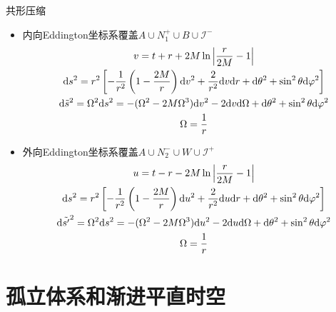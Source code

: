 共形压缩
\begin{itemize}
    \item 内向Eddington坐标系覆盖$A \cup N_1^+ \cup B \cup \mathscr{I}^-$
    \begin{gather*}
        v = t + r + 2M \ln \left|\frac{r}{2M} - 1\right|
        \\
        \mathrm{d} s^2 = r^2 \left[-\frac{1}{r^2}\left(1 - \frac{2M}{r}\right) \mathrm{d} v^2 + \frac{2}{r^2} \mathrm{d} v \mathrm{d} r + \mathrm{d} \theta^2 + \sin^2 \theta \mathrm{d} \varphi^2\right]
        \\
        \mathrm{d} \tilde{s}^2 = \Omega^2 \mathrm{d} s^2 = -(\Omega^2-2M\Omega^3) \mathrm{d} v^2 - 2 \mathrm{d} v \mathrm{d} \Omega + \mathrm{d} \theta^2 + \sin^2 \theta \mathrm{d} \varphi^2
        \\
        \Omega = \frac{1}{r}
    \end{gather*}
    \item 外向Eddington坐标系覆盖$A \cup N_2^- \cup W \cup \mathscr{I}^+$
    \begin{gather*}
        u = t - r - 2M \ln \left|\frac{r}{2M} - 1\right|
        \\
        \mathrm{d} s^2 = r^2 \left[-\frac{1}{r^2}\left(1 - \frac{2M}{r}\right) \mathrm{d} u^2 + \frac{2}{r^2} \mathrm{d} u \mathrm{d} r + \mathrm{d} \theta^2 + \sin^2 \theta \mathrm{d} \varphi^2\right]
        \\
        \mathrm{d} \tilde{s'}^2 = \Omega^2 \mathrm{d} s^2 = -(\Omega^2-2M\Omega^3) \mathrm{d} u^2 - 2 \mathrm{d} u \mathrm{d} \Omega + \mathrm{d} \theta^2 + \sin^2 \theta \mathrm{d} \varphi^2
        \\
        \Omega = \frac{1}{r}
    \end{gather*}
\end{itemize}

\section{孤立体系和渐进平直时空}

